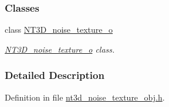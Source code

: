 \subsubsection*{Classes}
\begin{DoxyCompactItemize}
\item 
class \hyperlink{class_n_t3_d__noise__texture__o}{NT3D\_\-noise\_\-texture\_\-o}
\begin{DoxyCompactList}\small\item\em \hyperlink{class_n_t3_d__noise__texture__o}{NT3D\_\-noise\_\-texture\_\-o} class. \item\end{DoxyCompactList}\end{DoxyCompactItemize}


\subsubsection{Detailed Description}


Definition in file \hyperlink{nt3d__noise__texture__obj_8h_source}{nt3d\_\-noise\_\-texture\_\-obj.h}.


